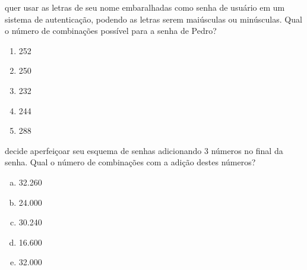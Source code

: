 \exercise{}  quer usar as letras de seu nome embaralhadas como
senha de usuário em um sistema de autenticação, podendo as letras
serem maiúsculas ou minúsculas. Qual o número de combinações possível
para a senha de Pedro?

\begin{enumerate}
\item 252 \correta
\item 250
\item 232
\item 244
\item 288
\end{enumerate}


\exercise{}  decide aperfeiçoar seu esquema de senhas adicionando
3 números no final da senha. Qual o número de combinações com a adição
destes números?

\begin{enumerate}[(a)]
\item 32.260
\item 24.000
\item 30.240 \correta
\item 16.600
\item 32.000
\end{enumerate}
